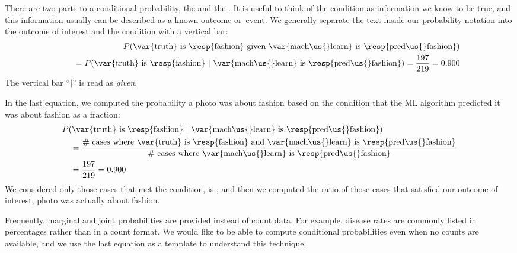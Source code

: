 There are two parts to a conditional probability,
the  and the .
It is useful to think of the condition as information we know
to be true, and this information usually can be described as
a known outcome or~event.
We generally separate the text inside our probability notation
into the outcome of interest and the condition with a
vertical bar:
\begin{align*}
&& P(\text{\var{truth} is \resp{fashion} given
    \var{mach\us{}learn} is \resp{pred\us{}fashion}}) \\
&& \quad = P(\text{\var{truth} is \resp{fashion}\ }|
    \text{\ \var{mach\us{}learn} is \resp{pred\us{}fashion}})
  = \frac{\fashYY{}}{\fashYA{}}
  = 0.900
\end{align*}
The vertical bar ``$|$'' is read as \emph{given}.


In the last equation, we computed the probability a photo
was about fashion based on the condition that the ML algorithm
predicted it was about fashion as a fraction:
\begin{align*}
& P(\text{\var{truth} is \resp{fashion}\ }|
    \text{\ \var{mach\us{}learn} is \resp{pred\us{}fashion}}) \\
  &\quad = \frac{\text{\# cases where \var{truth} is \resp{fashion}
       and \var{mach\us{}learn} is \resp{pred\us{}fashion}}}
     {\text{\# cases where \var{mach\us{}learn} is \resp{pred\us{}fashion}}}\\
  &\quad = \frac{\fashYY{}}{\fashYA{}}
      = 0.900
\end{align*}
We considered only those cases that met the condition,
 is , and then
we computed the ratio of those cases that satisfied our
outcome of interest, photo was actually about fashion.

Frequently, marginal and joint probabilities are provided
instead of count data.
For example, disease rates are commonly listed in percentages
rather than in a count format.
We would like to be able to compute conditional probabilities
even when no counts are available, and we use the last equation
as a template to understand this technique.

\D{\newpage}

